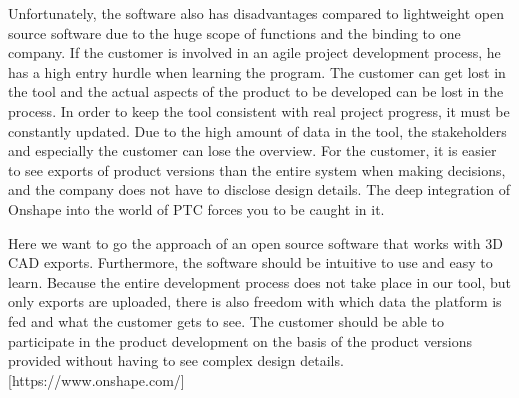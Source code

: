     Unfortunately, the software also has disadvantages compared to lightweight open source software due to the huge scope of functions and the binding to one company. If the customer is involved in an agile project development process, he has a high entry hurdle when learning the program. The customer can get lost in the tool and the actual aspects of the product to be developed can be lost in the process. In order to keep the tool consistent with real project progress, it must be constantly updated. Due to the high amount of data in the tool, the stakeholders and especially the customer can lose the overview. For the customer, it is easier to see exports of product versions than the entire system when making decisions, and the company does not have to disclose design details. The deep integration of Onshape into the world of PTC forces you to be caught in it. 

    Here we want to go the approach of an open source software that works with 3D CAD exports. Furthermore, the software should be intuitive to use and easy to learn. Because the entire development process does not take place in our tool, but only exports are uploaded, there is also freedom with which data the platform is fed and what the customer gets to see. The customer should be able to participate in the product development on the basis of the product versions provided without having to see complex design details.  [https://www.onshape.com/]


